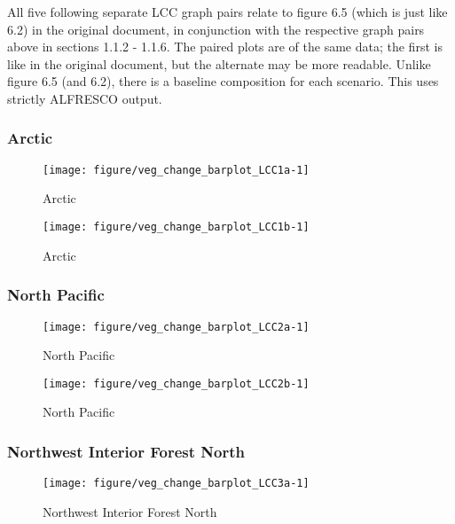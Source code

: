 \documentclass{article}\usepackage[]{graphicx}\usepackage[]{color}
\makeatletter
\def\maxwidth{ %
  \ifdim\Gin@nat@width>\linewidth
    \linewidth
  \else
    \Gin@nat@width
  \fi
}
\makeatother
\begin{document}
All five following separate LCC graph pairs relate to figure 6.5 (which is just like 6.2) in the original document, in conjunction with the respective graph pairs above in sections 1.1.2 - 1.1.6.
The paired plots are of the same data; the first is like in the original document, but the alternate may be more readable.
Unlike figure 6.5 (and 6.2), there is a baseline composition for each scenario.
This uses strictly ALFRESCO output.

\subsubsection{Arctic}
\begin{figure}[H]
\texttt{[image: figure/veg\_change\_barplot\_LCC1a-1]} \caption[Arctic]{Arctic\label{fig:veg_change_barplot_LCC1a}}
\end{figure}


\begin{figure}[H]
\texttt{[image: figure/veg\_change\_barplot\_LCC1b-1]} \caption[Arctic]{Arctic\label{fig:veg_change_barplot_LCC1b}}
\end{figure}



\subsubsection{North Pacific}
\begin{figure}[H]
\texttt{[image: figure/veg\_change\_barplot\_LCC2a-1]} \caption[North Pacific]{North Pacific\label{fig:veg_change_barplot_LCC2a}}
\end{figure}


\begin{figure}[H]
\texttt{[image: figure/veg\_change\_barplot\_LCC2b-1]} \caption[North Pacific]{North Pacific\label{fig:veg_change_barplot_LCC2b}}
\end{figure}



\subsubsection{Northwest Interior Forest North}
\begin{figure}[H]
\texttt{[image: figure/veg\_change\_barplot\_LCC3a-1]} \caption[Northwest Interior Forest North]{Northwest Interior Forest North\label{fig:veg_change_barplot_LCC3a}}
\end{figure}
\end{document}
